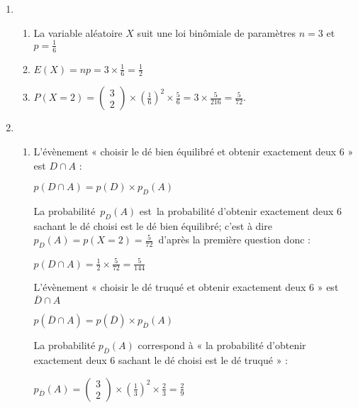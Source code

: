 \begin{corrige}
     \begin{enumerate}
          \item
          \begin{enumerate}[label=\alph*.]
               \item
               La variable aléatoire $X$ suit une loi binômiale de paramètres $n=3$ et $p=\frac{1}{6}$
               \item
               $E\left(X\right)=np=3\times \frac{1}{6}=\frac{1}{2}$
               \item
               $P\left(X=2\right)=\begin{pmatrix} 3 \\ 2 \end{pmatrix}\times \left(\frac{1}{6}\right)^{2}\times \frac{5}{6}=3\times \frac{5}{216}=\frac{5}{72}$.
          \end{enumerate}
          \item
          \begin{enumerate}[label=\alph*.]
               \item
               L'évènement « choisir le dé bien équilibré et obtenir exactement deux 6 » est $D \cap A$ :
               \par
               $p\left(D \cap A\right)=p\left(D\right)\times p_{D}\left(A\right)$
               \par
               La probabilité $ p_{D}\left(A\right)$ est la probabilité d'obtenir exactement deux 6 sachant le dé choisi est le dé bien équilibré; c'est à dire  $p_{D}(A)=p(X=2)=\frac{5}{72}$ d'après la première question donc :
               \par
               $p\left(D \cap A\right)=\frac{1}{2}\times \frac{5}{72}=\frac{5}{144}$
               \par
               L'évènement « choisir le dé truqué et obtenir exactement deux 6 » est $\overline{D} \cap A$
               \par
               $p\left(\overline{D} \cap A\right)=p\left(\overline{D}\right)\times p_{\overline{D}}\left(A\right)$
               \par
               La probabilité $p_{\overline{D}}\left(A\right)$ correspond à « la probabilité d'obtenir exactement deux 6 sachant le dé choisi est le dé truqué » :
               \par
               $p_{\overline{D}}\left(A\right)=\begin{pmatrix} 3 \\ 2 \end{pmatrix}\times \left(\frac{1}{3}\right)^{2}\times \frac{2}{3}=\frac{2}{9}$

\end{enumerate}
\end{enumerate}
\end{corrige}
